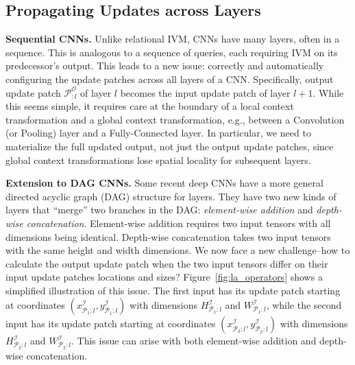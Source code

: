\subsection{Propagating Updates across Layers}

\vspace{2mm}
\noindent \textbf{Sequential CNNs.} Unlike relational IVM, CNNs have many layers, often in a sequence. This is analogous to a sequence of queries, each requiring IVM on its predecessor's output. This leads to a new issue: correctly and automatically configuring the update patches across all layers of a CNN. Specifically, output update patch $\mathcal{P}^{\mathcal{O}}_{:l}$ of layer $l$ becomes the input update patch of layer $l+1$. While this seems simple, it requires care at the boundary of a local context transformation and a global context transformation, e.g., between a Convolution (or Pooling) layer and a Fully-Connected layer. In particular, we need to materialize the full updated output, not just the output update patches, since global context transformations lose spatial locality for subsequent layers.

\vspace{2mm}
\noindent \textbf{Extension to DAG CNNs.} Some recent deep CNNs have a more general directed acyclic graph (DAG) structure for layers. They have two new kinds of layers that ``merge'' two branches in the DAG: \textit{element-wise addition} and \textit{depth-wise concatenation}. Element-wise addition requires two input tensors with all dimensions being identical. Depth-wise concatenation takes two input tensors with the same height and width dimensions. We now face a new challenge--how to calculate the output update patch when the two input tensors differ on their input update patches locations and sizes? Figure~\ref{fig:la_operators} shows a simplified illustration of this issue. The first input has its update patch starting at coordinates $(x^\mathcal{I}_{\mathcal{P}_1:l},y^\mathcal{I}_{\mathcal{P}_1:l})$ with dimensions $H^\mathcal{I}_{\mathcal{P}_1:l}$ and $W^\mathcal{I}_{\mathcal{P}_1:l}$, while the second input has its update patch starting at coordinates $(x^\mathcal{I}_{\mathcal{P}_2:l},y^\mathcal{I}_{\mathcal{P}_2:l})$ with dimensions $H^\mathcal{I}_{\mathcal{P}_2:l}$ and $W^\mathcal{I}_{\mathcal{P}_2:l}$. This issue can arise with both element-wise addition and depth-wise concatenation. 

